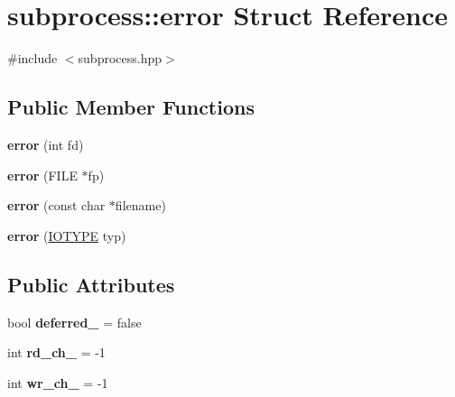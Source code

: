 \hypertarget{structsubprocess_1_1error}{}\section{subprocess\+:\+:error Struct Reference}
\label{structsubprocess_1_1error}


{\ttfamily \#include $<$subprocess.\+hpp$>$}

\subsection*{Public Member Functions}
\begin{DoxyCompactItemize}
\item 
\mbox{\label{structsubprocess_1_1error_abe27038da21efe616511f569719351a9}} 
{\bfseries error} (int fd)
\item 
\mbox{\label{structsubprocess_1_1error_a3a253a99366cd7c013113252d14f5d11}} 
{\bfseries error} (F\+I\+LE $\ast$fp)
\item 
\mbox{\label{structsubprocess_1_1error_ae8c5982feaface3d0cac81b67230b98f}} 
{\bfseries error} (const char $\ast$filename)
\item 
\mbox{\label{structsubprocess_1_1error_ab15605f08b33290b2eb9d6c32e368beb}} 
{\bfseries error} (\hyperlink{namespacesubprocess_a8c21131feb99bed9ffa644851ff499ed}{I\+O\+T\+Y\+PE} typ)
\end{DoxyCompactItemize}
\subsection*{Public Attributes}
\begin{DoxyCompactItemize}
\item 
\mbox{\label{structsubprocess_1_1error_a7538e30cd5c962898ce1061ce5a6da87}} 
bool {\bfseries deferred\+\_\+} = false
\item 
\mbox{\label{structsubprocess_1_1error_aef933354c0ef2c5c7f0bc53e9b80b624}} 
int {\bfseries rd\+\_\+ch\+\_\+} = -\/1
\item 
\mbox{\label{structsubprocess_1_1error_aeb8d713bd58af5bacd5454f0eefdff64}} 
int {\bfseries wr\+\_\+ch\+\_\+} = -\/1
\end{DoxyCompactItemize}


